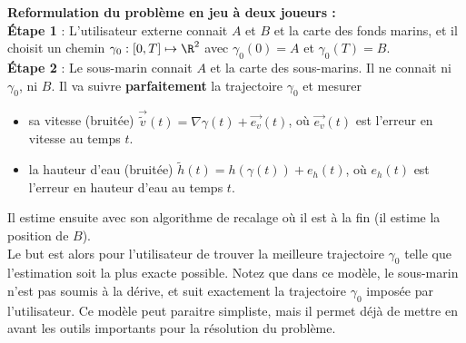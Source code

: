 \textbf{Reformulation du problème en jeu à deux joueurs :}\\
\textbf{\'Etape 1} : L'utilisateur externe connait $A$ et $B$ et la carte des fonds marins, et il choisit un chemin $\gamma_0 : [0, T] \mapsto \R^2$ avec $\gamma_0(0) = A$ et $\gamma_0(T) = B$.\\
\textbf{\'Etape 2} : Le sous-marin connait $A$ et la carte des sous-marins. Il ne connait ni $\gamma_0$, ni $B$. Il va suivre \textbf{parfaitement} la trajectoire $\gamma_0$ et mesurer
\begin{itemize}
	\item sa vitesse (bruitée) ${\vec{\widetilde{v}}}(t) = \nabla \gamma(t) + \vec{e_v}(t)$, où $\vec{e_v}(t)$ est l'erreur en vitesse au temps $t$.
	\item la hauteur d'eau (bruitée) $\widetilde h(t) = h(\gamma(t)) + e_h(t)$, où $e_h(t)$ est l'erreur en hauteur d'eau au temps $t$.
\end{itemize}
Il estime ensuite avec son algorithme de recalage où il est à la fin (il estime la position de $B$).\\

Le but est alors pour l'utilisateur de trouver la meilleure trajectoire $\gamma_0$ telle que l'estimation soit la plus exacte possible. Notez que dans ce modèle, le sous-marin n'est pas soumis à la dérive, et suit exactement la trajectoire $\gamma_0$ imposée par l'utilisateur. Ce modèle peut paraitre simpliste, mais il permet déjà de mettre en avant les outils importants pour la résolution du problème. \\


